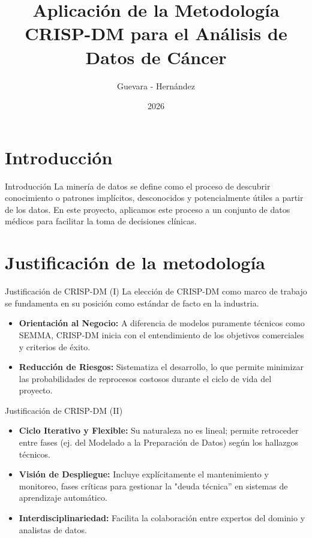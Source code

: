 \documentclass{beamer}
\title[Minería de Datos - Cancer Data]{Aplicación de la Metodología CRISP-DM para el Análisis de Datos de Cáncer}
\author{Guevara - Hernández}
\institute{UCV}
\date{2026}
\begin{document}
	
	\begin{frame}
		\titlepage
	\end{frame}
	
	\section{Introducción}
	\begin{frame}{Introducción}
		La minería de datos se define como el proceso de descubrir conocimiento o patrones implícitos, desconocidos y potencialmente útiles a partir de los datos. En este proyecto, aplicamos este proceso a un conjunto de datos médicos para facilitar la toma de decisiones clínicas.
	\end{frame}
	
	\section{Justificación de la metodología}
	\begin{frame}{Justificación de CRISP-DM (I)}
		La elección de CRISP-DM como marco de trabajo se fundamenta en su posición como estándar de facto en la industria.
		\begin{itemize}
			\item<1-> \textbf{Orientación al Negocio:} A diferencia de modelos puramente técnicos como SEMMA, CRISP-DM inicia con el entendimiento de los objetivos comerciales y criterios de éxito.
			\item<2-> \textbf{Reducción de Riesgos:} Sistematiza el desarrollo, lo que permite minimizar las probabilidades de reprocesos costosos durante el ciclo de vida del proyecto.
		\end{itemize}
	\end{frame}
	
	
	\begin{frame}{Justificación de CRISP-DM (II)}
		\begin{itemize}
			\item<1-> \textbf{Ciclo Iterativo y Flexible:} Su naturaleza no es lineal; permite retroceder entre fases (ej. del Modelado a la Preparación de Datos) según los hallazgos técnicos.
			\item<2-> \textbf{Visión de Despliegue:} Incluye explícitamente el mantenimiento y monitoreo, fases críticas para gestionar la "deuda técnica'' en sistemas de aprendizaje automático.
			\item<3-> \textbf{Interdisciplinariedad:} Facilita la colaboración entre expertos del dominio y analistas de datos.
		\end{itemize}
	\end{frame}
	
\end{document}
